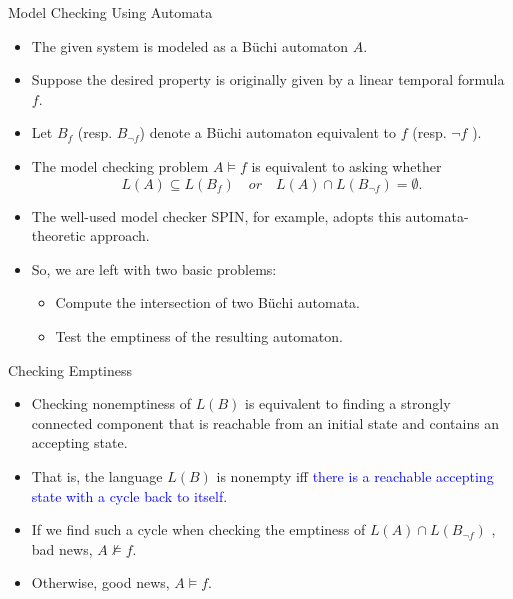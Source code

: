\documentclass[12pt]{beamer}
\author{林宏陽}
\begin{document}
\begin{frame}
\maketitle
\end{frame}

\begin{frame}{Model Checking Using Automata}
	\begin{itemize}
	\item The given system is modeled as a Büchi automaton $A$.
	\item Suppose the desired property is originally given by a linear temporal formula $f$.
	\item Let $B_{f}$ (resp. $B_{\neg f}$) denote a Büchi automaton equivalent to $f$ (resp. $\neg f$ ).
	\item The model checking problem $A \models f$ is equivalent to asking whether
$$L(A) \subseteq L(B_{f}) \quad or \quad L(A) \cap L(B_{\neg f}) = \emptyset.$$
	\item The well-used model checker SPIN, for example, adopts this automata-theoretic approach.
	\item So, we are left with two basic problems:
			\begin{itemize}
			\item Compute the intersection of two Büchi automata.
			\item Test the emptiness of the resulting automaton.
			\end{itemize}
	\end{itemize}
\end{frame}

\begin{frame}{Checking Emptiness}
	\begin{itemize}
	\item Checking nonemptiness of $L(B)$ is equivalent to finding a strongly connected component that is reachable from an initial state and contains an accepting state.
	\item That is, the language $L(B)$ is nonempty iff \textcolor{blue}{there is a reachable accepting state with a cycle back to itself}.
	\item If we find such a cycle when checking the emptiness of $L(A) \cap L(B_{\neg f})$ , bad news, $A \not\models f$.
	\item Otherwise, good news, $A \models f$.
	\end{itemize}
\end{frame}
\end{document}
